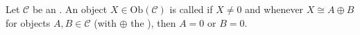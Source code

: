 \begin{definition} \label{definition:indecomposable_object_of_an_additive_category}
Let $\mathcal{C}$ be an . An object $X \in \mathrm{Ob}(\mathcal{C})$ is called  if $X \neq 0$ and whenever $X \cong A \oplus B$ for objects $A, B \in \mathcal{C}$ (with $\oplus$ the ), then $A = 0$ or $B = 0$.
\end{definition}
